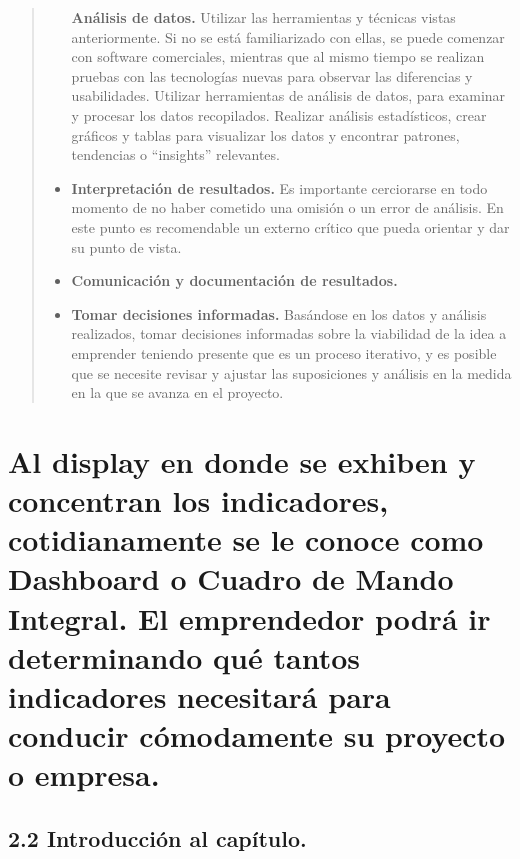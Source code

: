 \documentclass[
  letterpaper,
  DIV=11,
  numbers=noendperiod]{scrreprt}
\begin{document}
\begin{quote}
\begin{itemize}
  \textbf{Análisis de datos.} Utilizar las herramientas y técnicas
  vistas anteriormente. Si no se está familiarizado con ellas, se puede
  comenzar con software comerciales, mientras que al mismo tiempo se
  realizan pruebas con las tecnologías nuevas para observar las
  diferencias y usabilidades. Utilizar herramientas de análisis de
  datos, para examinar y procesar los datos recopilados. Realizar
  análisis estadísticos, crear gráficos y tablas para visualizar los
  datos y encontrar patrones, tendencias o ``insights'' relevantes.
\item
  \textbf{Interpretación de resultados.} Es importante cerciorarse en
  todo momento de no haber cometido una omisión o un error de análisis.
  En este punto es recomendable un externo crítico que pueda orientar y
  dar su punto de vista.
\item
  \textbf{Comunicación y documentación de resultados.}
\item
  \textbf{Tomar decisiones informadas.} Basándose en los datos y
  análisis realizados, tomar decisiones informadas sobre la viabilidad
  de la idea a emprender teniendo presente que es un proceso iterativo,
  y es posible que se necesite revisar y ajustar las suposiciones y
  análisis en la medida en la que se avanza en el proyecto.
\end{itemize}
\end{quote}


\hypertarget{al-display-en-donde-se-exhiben-y-concentran-los-indicadores-cotidianamente-se-le-conoce-como-dashboard-o-cuadro-de-mando-integral.-el-emprendedor-podruxe1-ir-determinando-quuxe9-tantos-indicadores-necesitaruxe1-para-conducir-cuxf3modamente-su-proyecto-o-empresa.}{%
\chapter{Al display en donde se exhiben y concentran los indicadores,
cotidianamente se le conoce como Dashboard o Cuadro de Mando Integral.
El emprendedor podrá ir determinando qué tantos indicadores necesitará
para conducir cómodamente su proyecto o
empresa.}\label{al-display-en-donde-se-exhiben-y-concentran-los-indicadores-cotidianamente-se-le-conoce-como-dashboard-o-cuadro-de-mando-integral.-el-emprendedor-podruxe1-ir-determinando-quuxe9-tantos-indicadores-necesitaruxe1-para-conducir-cuxf3modamente-su-proyecto-o-empresa.}}

\hypertarget{introducciuxf3n-al-capuxedtulo.-1}{%
\section{2.2 Introducción al
capítulo.}\label{introducciuxf3n-al-capuxedtulo.-1}}
\end{document}
